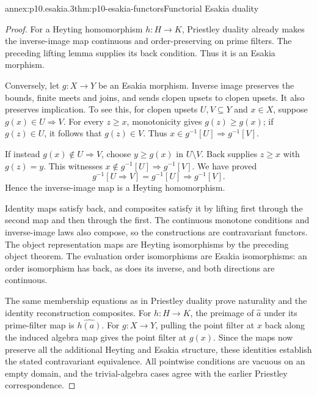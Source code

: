 \begin{annexitem}{annex:p10.esakia.3}{thm:p10-esakia-functors}{Functorial Esakia duality}
\begin{proof}
For a Heyting homomorphism \(h:H\to K\), Priestley duality
already makes the inverse-image map continuous and
order-preserving on prime filters.
The preceding lifting lemma supplies its back condition.
Thus it is an Esakia morphism.

Conversely, let \(g:X\to Y\) be an Esakia morphism.
Inverse image preserves the bounds, finite meets and joins,
and sends clopen upsets to clopen upsets.
It also preserves implication.
To see this, for clopen upsets \(U,V\subseteq Y\) and \(x\in X\),
suppose \(g(x)\in U\Rightarrow V\).
For every \(z\geq x\), monotonicity gives \(g(z)\geq g(x)\);
if \(g(z)\in U\), it follows that \(g(z)\in V\).
Thus \(x\in g^{-1}[U]\Rightarrow g^{-1}[V]\).

If instead \(g(x)\notin U\Rightarrow V\), choose
\(y\geq g(x)\) in \(U\setminus V\).
Back supplies \(z\geq x\) with \(g(z)=y\).
This witnesses
\(x\notin g^{-1}[U]\Rightarrow g^{-1}[V]\).
We have proved
\[
 g^{-1}[U\Rightarrow V]
       =g^{-1}[U]\Rightarrow g^{-1}[V].
\]
Hence the inverse-image map is a Heyting homomorphism.

Identity maps satisfy back, and composites satisfy it by
lifting first through the second map and then through the first.
The continuous monotone conditions and inverse-image laws
also compose, so the constructions are contravariant functors.
The object representation maps are Heyting isomorphisms by
the preceding object theorem.
The evaluation order isomorphisms are Esakia isomorphisms:
an order isomorphism has back, as does its inverse, and both
directions are continuous.

The same membership equations as in Priestley duality prove
naturality and the identity reconstruction composites.
For \(h:H\to K\), the preimage of \(\widehat a\) under its
prime-filter map is \(\widehat{h(a)}\).
For \(g:X\to Y\), pulling the point filter at \(x\) back
along the induced algebra map gives the point filter at \(g(x)\).
Since the maps now preserve all the additional Heyting and
Esakia structure, these identities establish the stated
contravariant equivalence.
All pointwise conditions are vacuous on an empty domain,
and the trivial-algebra cases agree with the earlier Priestley
correspondence.
\end{proof}
\end{annexitem}
